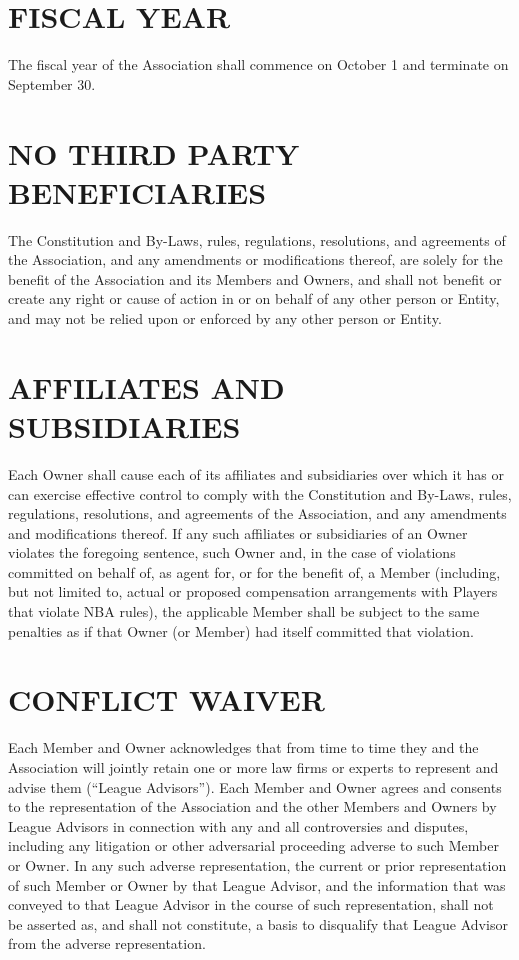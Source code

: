 \documentclass[]{book}
\begin{document}
\hypertarget{fiscal-year}{%
\section{FISCAL YEAR}\label{fiscal-year}}

The fiscal year of the Association shall commence on October 1 and terminate on September 30.

\hypertarget{no-third-party-beneficiaries}{%
\section{NO THIRD PARTY BENEFICIARIES}\label{no-third-party-beneficiaries}}

The Constitution and By-Laws, rules, regulations, resolutions, and agreements of the Association, and any amendments or modifications thereof, are solely for the benefit of the Association and its Members and Owners, and shall not benefit or create any right or cause of action in or on behalf of any other person or Entity, and may not be relied upon or enforced by any other person or Entity.

\hypertarget{affiliates-and-subsidiaries}{%
\section{AFFILIATES AND SUBSIDIARIES}\label{affiliates-and-subsidiaries}}

Each Owner shall cause each of its affiliates and subsidiaries over which it has or can exercise effective control to comply with the Constitution and By-Laws, rules, regulations, resolutions, and agreements of the Association, and any amendments and modifications thereof. If any such affiliates or subsidiaries of an Owner violates the foregoing sentence, such Owner and, in the case of violations committed on behalf of, as agent for, or for the benefit of, a Member (including, but not limited to, actual or proposed compensation arrangements with Players that violate NBA rules), the applicable Member shall be subject to the same penalties as if that Owner (or Member) had itself committed that violation.

\hypertarget{conflict-waiver}{%
\section{CONFLICT WAIVER}\label{conflict-waiver}}

Each Member and Owner acknowledges that from time to time they and the Association will jointly retain one or more law firms or experts to represent and advise them (``League Advisors''). Each Member and Owner agrees and consents to the representation of the Association and the other Members and Owners by League Advisors in connection with any and all controversies and disputes, including any litigation or other adversarial proceeding adverse to such Member or Owner. In any such adverse representation, the current or prior representation of such Member or Owner by that League Advisor, and the information that was conveyed to that League Advisor in the course of such representation, shall not be asserted as, and shall not constitute, a basis to disqualify that League Advisor from the adverse representation.
\end{document}
